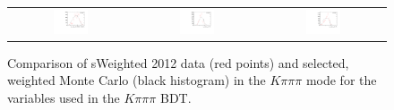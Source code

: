 \begin{figure}
\begin{tabular}{ccc}
\includegraphics[width=0.3\textwidth]{ANA_resources/Plots/Monte_carlo/data_vs_MC/weight/Kpipipi/log10(KstarPi_IPCHI2_OWNPV)_2012.pdf} & \includegraphics[width=0.3\textwidth]{ANA_resources/Plots/Monte_carlo/data_vs_MC/weight/Kpipipi/log10(KstarK_PT)_2012.pdf} & \includegraphics[width=0.3\textwidth]{ANA_resources/Plots/Monte_carlo/data_vs_MC/weight/Kpipipi/log10(KstarPi_PT)_2012.pdf} \\
\end{tabular}
\caption{Comparison of sWeighted 2012 data (red points) and selected, weighted Monte Carlo (black histogram) in the $K\pi\pi\pi$ mode for the variables used in the $K\pi\pi\pi$ BDT.}
\label{fig:data_vs_MC_Kpipipi_2012}
\end{figure}
